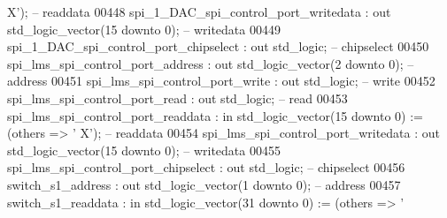 \begin{DoxyCode}
      X'); \textcolor{keyword}{-- readdata}
00448             spi\_1\_DAC\_spi\_control\_port\_writedata        : \textcolor{keywordflow}{out} \textcolor{comment}{std\_logic\_vector}(\textcolor{vhdllogic}{}\textcolor{vhdllogic}{15} \textcolor{keywordflow}{downto} \textcolor{vhdllogic}{}\textcolor{vhdllogic}{0});               
           \textcolor{keyword}{-- writedata}
00449             spi\_1\_DAC\_spi\_control\_port\_chipselect       : \textcolor{keywordflow}{out} \textcolor{comment}{std\_logic};                                   
           \textcolor{keyword}{-- chipselect}
00450             spi\_lms\_spi\_control\_port\_address            : \textcolor{keywordflow}{out} \textcolor{comment}{std\_logic\_vector}(\textcolor{vhdllogic}{}\textcolor{vhdllogic}{2} \textcolor{keywordflow}{downto} \textcolor{vhdllogic}{}\textcolor{vhdllogic}{0});                
           \textcolor{keyword}{-- address}
00451             spi\_lms\_spi\_control\_port\_write              : \textcolor{keywordflow}{out} \textcolor{comment}{std\_logic};                                   
           \textcolor{keyword}{-- write}
00452             spi\_lms\_spi\_control\_port\_read               : \textcolor{keywordflow}{out} \textcolor{comment}{std\_logic};                                   
           \textcolor{keyword}{-- read}
00453             spi\_lms\_spi\_control\_port\_readdata           : \textcolor{keywordflow}{in}  \textcolor{comment}{std\_logic\_vector}(\textcolor{vhdllogic}{}\textcolor{vhdllogic}{15} \textcolor{keywordflow}{downto} \textcolor{vhdllogic}{}\textcolor{vhdllogic}{0}) := (\textcolor{keywordflow}{others} => '
      X'); \textcolor{keyword}{-- readdata}
00454             spi\_lms\_spi\_control\_port\_writedata          : \textcolor{keywordflow}{out} \textcolor{comment}{std\_logic\_vector}(\textcolor{vhdllogic}{}\textcolor{vhdllogic}{15} \textcolor{keywordflow}{downto} \textcolor{vhdllogic}{}\textcolor{vhdllogic}{0});               
           \textcolor{keyword}{-- writedata}
00455             spi\_lms\_spi\_control\_port\_chipselect         : \textcolor{keywordflow}{out} \textcolor{comment}{std\_logic};                                   
           \textcolor{keyword}{-- chipselect}
00456             switch\_s1\_address                           : \textcolor{keywordflow}{out} \textcolor{comment}{std\_logic\_vector}(\textcolor{vhdllogic}{}\textcolor{vhdllogic}{1} \textcolor{keywordflow}{downto} \textcolor{vhdllogic}{}\textcolor{vhdllogic}{0});                
           \textcolor{keyword}{-- address}
00457             switch\_s1\_readdata                          : \textcolor{keywordflow}{in}  \textcolor{comment}{std\_logic\_vector}(\textcolor{vhdllogic}{}\textcolor{vhdllogic}{31} \textcolor{keywordflow}{downto} \textcolor{vhdllogic}{}\textcolor{vhdllogic}{0}) := (\textcolor{keywordflow}{others} => '

\end{DoxyCode}
